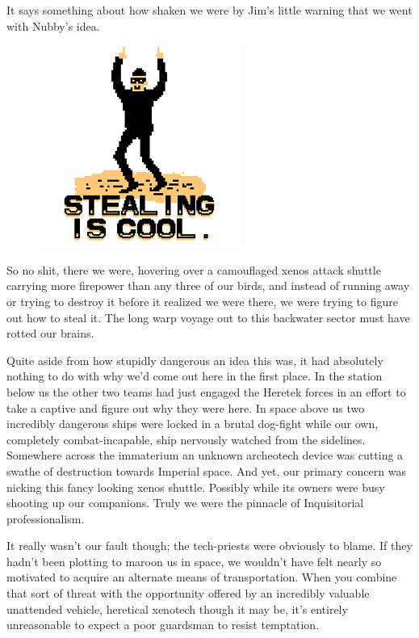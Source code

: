 It says something about how shaken we were by Jim’s little warning that we went with Nubby’s idea.

\begin{figure}
	\begin{center}
		\includegraphics[width=\figwidth]{pics/11/48.png}
	\end{center}
\end{figure}
So no shit, there we were, hovering over a camouflaged xenos attack shuttle carrying more firepower than any three of our birds, and instead of running away or trying to destroy it before it realized we were there, we were trying to figure out how to steal it. 
The long warp voyage out to this backwater sector must have rotted our brains.
 
Quite aside from how stupidly dangerous an idea this was, it had absolutely nothing to do with why we’d come out here in the first place. 
In the station below us the other two teams had just engaged the Heretek forces in an effort to take a captive and figure out why they were here. 
In space above us two incredibly dangerous ships were locked in a brutal dog-fight while our own, completely combat-incapable, ship nervously watched from the sidelines. 
Somewhere across the immaterium an unknown archeotech device was cutting a swathe of destruction towards Imperial space. 
And yet, our primary concern was nicking this fancy looking xenos shuttle. 
Possibly while its owners were busy shooting up our companions. 
Truly we were the pinnacle of Inquisitorial professionalism.
 
It really wasn’t our fault though; 
the tech-priests were obviously to blame. 
If they hadn’t been plotting to maroon us in space, we wouldn’t have felt nearly so motivated to acquire an alternate means of transportation. 
When you combine that sort of threat with the opportunity offered by an incredibly valuable unattended vehicle, heretical xenotech though it may be, it’s entirely unreasonable to expect a poor guardsman to resist temptation.
 
